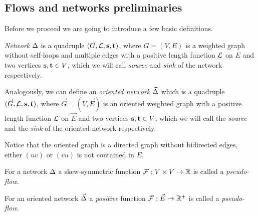 \documentclass[12pt,oneside,a4paper]{amsart}
\begin{document}
    \subsection{Flows and networks preliminaries}
      Before we proceed we are going to introduce a few basic definitions.
      \begin{definition}
        \emph{Network} $\Delta$ is a quadruple $(G, \mathcal{L}, \mathbf{s}, \mathbf{t})$, where $G = (V, E)$ is a weighted graph without
        self-loops and multiple edges
        with a positive length function $\mathcal{L}$ on $E$ and two vertices $\mathbf{s}, \mathbf{t} \in V$, which
        we will call \emph{source} and \emph{sink} of the network respectively.

        Analogously, we can define an \emph{oriented network} $\vec{\Delta}$ which is
          a quadruple $(\vec{G}, \mathcal{L}, \mathbf{s}, \mathbf{t})$, where
          $\vec{G} = (V, \vec{E})$ is an oriented weighted graph with
          a positive length function $\mathcal{L}$ on $\vec{E}$ and two vertices $\mathbf{s}, \mathbf{t} \in V$, which
          we will call the \emph{source} and the \emph{sink} of the oriented network respectively.
      \end{definition}
      \begin{remark}
        Notice that the oriented graph is a directed graph without bidirected edges,
          either $(uv)$ or $(vu)$ is not contained in $E$.
      \end{remark}
      \begin{definition}
        For a network $\Delta$ a skew-symmetric function
          $\mathcal{F}: V \times V \to \mathbb{R}$ is called a \emph{pseudo-flow}.
      \end{definition}
      \begin{definition}
        For an oriented network $\vec{\Delta}$ a \emph{positive} function
          $\mathcal{F}: \vec{E} \to \mathbb{R}^{+}$ is called a \emph{pseudo-flow}.
      \end{definition}
\end{document}
